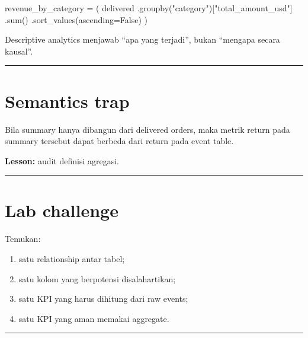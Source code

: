 \documentclass[
  indonesian,
  letterpaper,
  DIV=11,
  numbers=noendperiod]{scrreprt}
\newenvironment{Shaded}{\begin{snugshade}}{\end{snugshade}}
\newcommand{\BuiltInTok}[1]{\textcolor[rgb]{0.00,0.23,0.31}{#1}}
\newcommand{\NormalTok}[1]{\textcolor[rgb]{0.00,0.23,0.31}{#1}}
\newcommand{\OperatorTok}[1]{\textcolor[rgb]{0.37,0.37,0.37}{#1}}
\newcommand{\StringTok}[1]{\textcolor[rgb]{0.13,0.47,0.30}{#1}}
\newcommand{\VariableTok}[1]{\textcolor[rgb]{0.07,0.07,0.07}{#1}}
\providecommand{\tightlist}{%
  \setlength{\itemsep}{0pt}\setlength{\parskip}{0pt}}
\begin{document}
\begin{Shaded}
\begin{Highlighting}[]
\NormalTok{revenue\_by\_category }\OperatorTok{=}\NormalTok{ (}
\NormalTok{    delivered}
\NormalTok{    .groupby(}\StringTok{"category"}\NormalTok{)[}\StringTok{"total\_amount\_usd"}\NormalTok{]}
\NormalTok{    .}\BuiltInTok{sum}\NormalTok{()}
\NormalTok{    .sort\_values(ascending}\OperatorTok{=}\VariableTok{False}\NormalTok{)}
\NormalTok{)}
\end{Highlighting}
\end{Shaded}

Descriptive analytics menjawab ``apa yang terjadi'', bukan ``mengapa
secara kausal''.

\begin{center}\rule{0.5\linewidth}{0.5pt}\end{center}

\section{Semantics trap}\label{semantics-trap}

Bila summary hanya dibangun dari delivered orders, maka metrik return
pada summary tersebut dapat berbeda dari return pada event table.

\textbf{Lesson:} audit definisi agregasi.

\begin{center}\rule{0.5\linewidth}{0.5pt}\end{center}

\section{Lab challenge}\label{lab-challenge}

Temukan:

\begin{enumerate}
\def\labelenumi{\arabic{enumi}.}
\tightlist
\item
  satu relationship antar tabel;
\item
  satu kolom yang berpotensi disalahartikan;
\item
  satu KPI yang harus dihitung dari raw events;
\item
  satu KPI yang aman memakai aggregate.
\end{enumerate}

\begin{center}\rule{0.5\linewidth}{0.5pt}\end{center}
\end{document}
